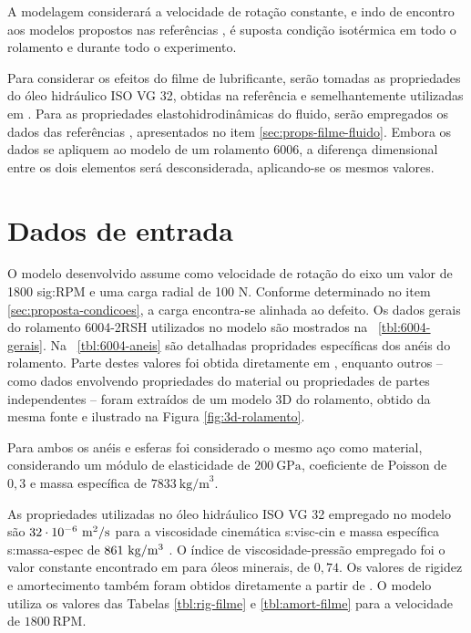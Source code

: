 \documentclass[12pt,oneside,english,brazil,lmodern,siglas,simbolos,cite=num]{ucsmonograph}
\begin{document}
	A modelagem considerará a velocidade de rotação constante, e indo de encontro aos modelos propostos nas referências \cite{mcfadden:1984,sassi:2007,patil:2010,cong:2013,tandon:1997}, é suposta condição isotérmica em todo o rolamento e durante todo o experimento.
	
	Para considerar os efeitos do filme de lubrificante, serão tomadas as propriedades do óleo hidráulico ISO VG 32, obtidas na referência \cite{iso-vg32} e semelhantemente utilizadas em \cite{nonato:2014}.
	Para as propriedades elastohidrodinâmicas do fluido, serão empregados os dados das referências \cite{roelands:1966,nonato:2014}, apresentados no item \ref{sec:props-filme-fluido}.
	Embora os dados se apliquem ao modelo de um rolamento 6006, a diferença dimensional entre os dois elementos será desconsiderada, aplicando-se os mesmos valores.
	
	\section{Dados de entrada} \label{sec:dados-entrada}
	O modelo desenvolvido assume como velocidade de rotação do eixo um valor de 1800 \gls{sig:RPM} e uma carga radial de 100 N.
	Conforme determinado no item \ref{sec:proposta-condicoes}, a carga encontra-se alinhada ao defeito.
	Os dados gerais do rolamento 6004-2RSH utilizados no modelo são mostrados na \tablename\ \ref{tbl:6004-gerais}.
	Na \tablename\ \ref{tbl:6004-aneis} são detalhadas propridades específicas dos anéis do rolamento.
	Parte destes valores foi obtida diretamente em \cite{skf6004}, enquanto outros -- como dados envolvendo propriedades do material ou propriedades de partes independentes -- foram extraídos de um modelo 3D do rolamento, obtido da mesma fonte e ilustrado na Figura \ref{fig:3d-rolamento}.
	
	Para ambos os anéis e esferas foi considerado o mesmo aço como material, considerando um módulo de elasticidade de $200\ \text{GPa}$, coeficiente de Poisson de $ 0,3 $ e massa específica de $ 7833\ \text{kg/m}^3$.
	
	As propriedades utilizadas no óleo hidráulico ISO VG 32 empregado no modelo são $32\cdot 10^{-6}\ \text{m\textsuperscript{2}/s}$ para a viscosidade cinemática \gls{s:visc-cin} e massa específica \gls{s:massa-espec} de $861\ \text{kg/m\textsuperscript{3}}$ \cite{iso-vg32}.
	O índice de viscosidade-pressão empregado foi o valor constante encontrado em \cite{roelands:1966} para óleos minerais, de $0,74$.
	Os valores de rigidez e amortecimento também foram obtidos diretamente a partir de \cite{nonato:2014}.
	O modelo utiliza os valores das Tabelas \ref{tbl:rig-filme} e \ref{tbl:amort-filme} para a velocidade de $1800\ \text{RPM}$.
	
\end{document}
